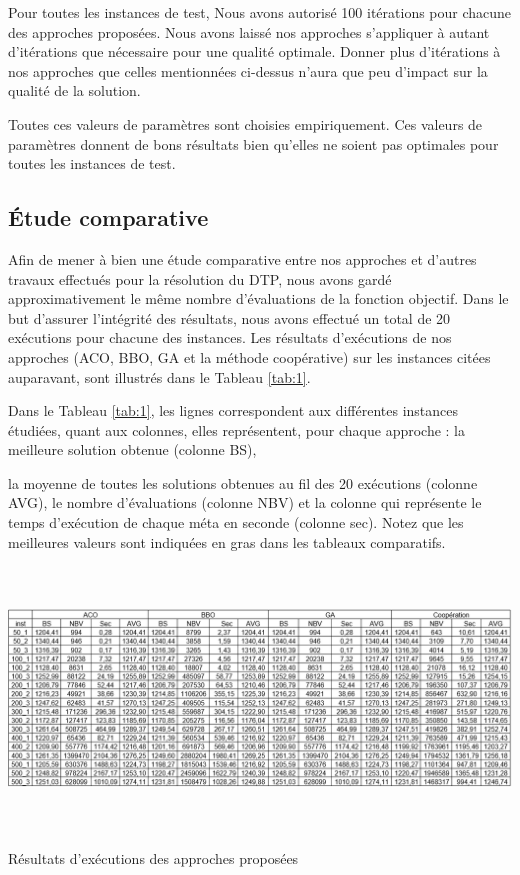 Pour toutes les instances de test, Nous avons autorisé 100 itérations pour chacune des approches proposées. Nous avons laissé nos approches s’appliquer à autant d’itérations que nécessaire pour une qualité optimale. Donner plus d'itérations à nos approches que celles mentionnées ci-dessus n'aura que peu d'impact sur la qualité de la solution.

Toutes ces valeurs de paramètres sont choisies empiriquement. Ces valeurs de paramètres donnent de bons résultats bien qu'elles ne soient pas optimales pour toutes les instances de test.


\subsection{Étude comparative}
Afin de mener à bien une étude comparative entre nos approches et d’autres travaux effectués pour la résolution du DTP, nous avons gardé approximativement le même nombre d’évaluations de la fonction objectif.
Dans le but d’assurer l’intégrité des résultats, nous avons effectué un total de 20 exécutions pour chacune des instances. Les résultats d’exécutions de nos approches (ACO, BBO, GA et la méthode coopérative) sur les instances citées auparavant, sont illustrés dans le Tableau \ref{tab:1}.

Dans le Tableau  \ref{tab:1}, les lignes correspondent aux différentes instances étudiées, quant aux colonnes, elles représentent, pour chaque approche : la meilleure solution obtenue (colonne BS),

la moyenne de toutes les solutions obtenues au fil des 20 exécutions (colonne AVG), le nombre d’évaluations  (colonne NBV) et la colonne qui représente le temps d’exécution de chaque méta en seconde (colonne sec). 
Notez que les meilleures valeurs sont indiquées en gras dans les tableaux comparatifs.

\begin{table}[H]
	\includegraphics[width=17cm,height=7cm]{Chap5/t1.png}
	\caption{Résultats d’exécutions des  approches proposées}
	\label{tab:1}
\end{table}


